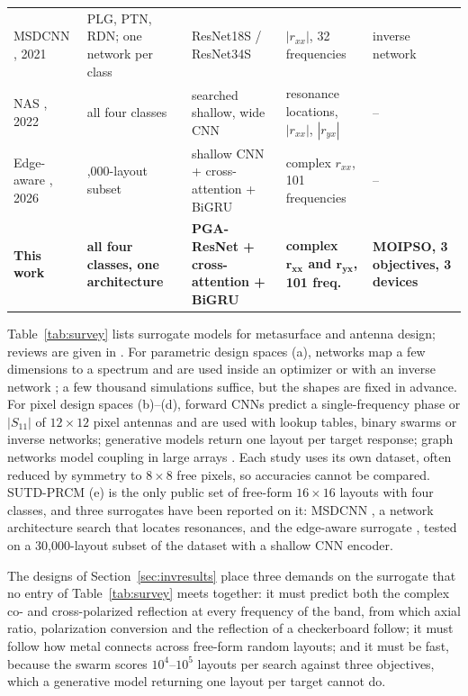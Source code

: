 \documentclass[journal]{IEEEtran}
\begin{document}
\begin{table}[!t]
\begin{tabular}{@{}>{\raggedright\arraybackslash}p{2.6cm}>{\raggedright\arraybackslash}p{3.7cm}>{\raggedright\arraybackslash}p{3.9cm}>{\raggedright\arraybackslash}p{3.6cm}>{\raggedright\arraybackslash}p{3.4cm}@{}}
MSDCNN \cite{msdcnn}, 2021 & PLG, PTN, RDN; one network per class & ResNet18S / ResNet34S & $|r_{xx}|$, 32 frequencies & inverse network \\
NAS \cite{sutd,zhang_nas}, 2022 & all four classes & searched shallow, wide CNN & resonance locations, $|r_{xx}|$, $|r_{yx}|$ & -- \\
Edge-aware \cite{edgeaware}, 2026 & 30,000-layout subset & shallow CNN + cross-attention + BiGRU & complex $r_{xx}$, 101 frequencies & -- \\
\textbf{This work} & \textbf{all four classes, one architecture} & \textbf{PGA-ResNet + cross-attention + BiGRU} & \textbf{complex $\boldsymbol{r_{xx}}$ and $\boldsymbol{r_{yx}}$, 101 freq.} & \textbf{MOIPSO, 3 objectives, 3 devices} \\
\bottomrule
\end{tabular}
\end{table}

Table~\ref{tab:survey} lists surrogate models for metasurface and antenna design; reviews are given in \cite{khatib_review,chen_gadreview}. For parametric design spaces (a), networks map a few dimensions to a spectrum and are used inside an optimizer \cite{yu_fss} or with an inverse network \cite{liu_tandem,niu_rcs}; a few thousand simulations suffice, but the shapes are fixed in advance. For pixel design spaces (b)--(d), forward CNNs predict a single-frequency phase \cite{zhu_phase} or $|S_{11}|$ of $12\times12$ pixel antennas \cite{gupta_tandem,gupta_tl} and are used with lookup tables, binary swarms or inverse networks; generative models \cite{niu_diffusion,lyu_fss} return one layout per target response; graph networks model coupling in large arrays \cite{khoram_gnn,bao_gatnet}. Each study uses its own dataset, often reduced by symmetry to $8\times8$ free pixels, so accuracies cannot be compared. SUTD-PRCM (e) is the only public set of free-form $16\times16$ layouts with four classes, and three surrogates have been reported on it: MSDCNN \cite{msdcnn}, a network architecture search \cite{sutd,zhang_nas} that locates resonances, and the edge-aware surrogate \cite{edgeaware}, tested on a 30,000-layout subset of the dataset with a shallow CNN encoder.

The designs of Section~\ref{sec:invresults} place three demands on the surrogate that no entry of Table~\ref{tab:survey} meets together: it must predict both the complex co- and cross-polarized reflection at every frequency of the band, from which axial ratio, polarization conversion and the reflection of a checkerboard follow; it must follow how metal connects across free-form random layouts; and it must be fast, because the swarm scores $10^4$--$10^5$ layouts per search against three objectives, which a generative model returning one layout per target cannot do.
\end{document}
